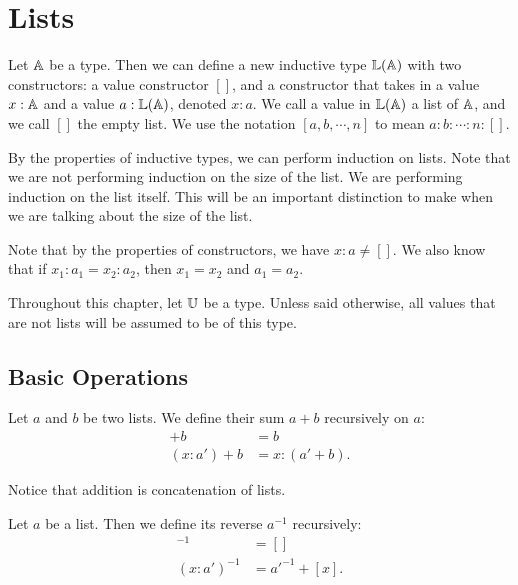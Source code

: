 \documentclass[../math.tex]{subfiles}
\begin{document}
\setcounter{chapter}{4}

\chapter{Lists}

\begin{definition}
    Let $\mathbb{A}$ be a type.  Then we can define a new inductive type $\mathbb{L}(\mathbb{A})$ with
    two constructors: a value constructor $[]$, and a constructor that takes in
    a value $x : \mathbb{A}$ and a value $a : \mathbb{L}(\mathbb{A})$, denoted $x : a$.  We call a
    value in $\mathbb{L}(\mathbb{A})$ a list of $\mathbb{A}$, and we call $[]$ the empty list.  We use
    the notation $[a, b, \cdots, n]$ to mean $a : b : \cdots : n : []$.
\end{definition}

By the properties of inductive types, we can perform induction on lists.  Note
that we are not performing induction on the size of the list.  We are performing
induction on the list itself.  This will be an important distinction to make
when we are talking about the size of the list.

Note that by the properties of constructors, we have $x : a \neq []$.  We also
know that if $x_1 : a_1 = x_2 : a_2$, then $x_1 = x_2$ and $a_1 = a_2$.

Throughout this chapter, let $\mathbb{U}$ be a type.  Unless said otherwise, all values
that are not lists will be assumed to be of this type.

\section{Basic Operations}

\begin{instance}
    Let $a$ and $b$ be two lists.  We define their sum $a + b$ recursively on
    $a$:
    \begin{align*}
              [] + b &= b \\
        (x : a') + b &= x : (a' + b).
    \end{align*}
\end{instance}
\noindent Notice that addition is concatenation of lists.

\begin{definition}
    Let $a$ be a list.  Then we define its reverse $a^{-1}$ recursively:
    \begin{align*}
              []^{-1} &= [] \\
        (x : a')^{-1} &= a'^{-1} + [x].
    \end{align*}
\end{definition}
\end{document}
